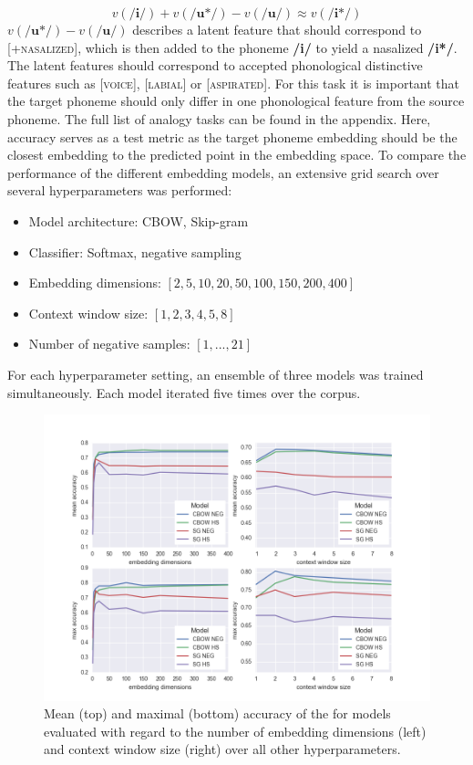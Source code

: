\documentclass[11pt]{article}
\begin{document}
\begin{equation}
v(\textbf{/i/} ) + v(\textbf{/u*/} ) -  v(\textbf{/u/} ) \approx v(\textbf{/i*/} )
\end{equation}
$v(\textbf{/u*/} ) -  v(\textbf{/u/} )$ describes a latent feature that should correspond to \textsc{[+nasalized]}, which is then added to the phoneme \textbf{/i/} to yield a nasalized \textbf{/i*/}. The latent features should correspond to accepted phonological distinctive features such as \textsc{[voice]}, \textsc{[labial]} or \textsc{[aspirated]}. For this task it is important that the target phoneme should only differ in one phonological feature from the source phoneme. The full list of analogy tasks can be found in the appendix. Here, accuracy serves as a test metric as the target phoneme embedding should be the closest embedding to the predicted point in the embedding space.
To compare the performance of the different embedding models, an extensive grid search over several hyperparameters was performed:
\begin{itemize}
\item Model architecture: CBOW, Skip-gram
\item Classifier: Softmax, negative sampling
\item Embedding dimensions: $[2, 5,10, 20, 50, 100, 150, 200, 400 ]$
\item Context window size: $[1,2,3,4,5,8]$
\item Number of negative samples: $[1, ..., 21]$
\end{itemize}
For each hyperparameter setting, an ensemble of three models was trained simultaneously. Each model iterated five times over the corpus.

\begin{figure}[h] %
   \centering
   \includegraphics[width=\textwidth]{4models_comparison_meanMax} 
   \caption{Mean (top) and maximal (bottom) accuracy of the for models evaluated with regard to the number of embedding dimensions (left) and context window size (right) over all other hyperparameters.}
   \label{fig:4models_comparison}
\end{figure}
\end{document}
